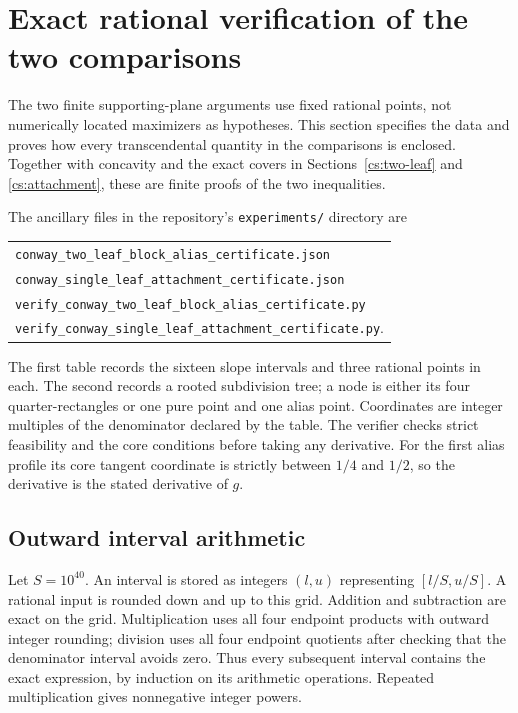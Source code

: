 \section{Exact rational verification of the two comparisons}\label{cs:arithmetic}

The two finite supporting-plane arguments use fixed rational points, not numerically located maximizers as hypotheses. This section specifies the data and proves how every transcendental quantity in the comparisons is enclosed. Together with concavity and the exact covers in Sections~\ref{cs:two-leaf} and \ref{cs:attachment}, these are finite proofs of the two inequalities.

The ancillary files in the repository's \texttt{experiments/} directory are
\begin{center}\small
\begin{tabular}{l}
\texttt{conway\_two\_leaf\_block\_alias\_certificate.json}\\
\texttt{conway\_single\_leaf\_attachment\_certificate.json}\\
\texttt{verify\_conway\_two\_leaf\_block\_alias\_certificate.py}\\
\texttt{verify\_conway\_single\_leaf\_attachment\_certificate.py}.
\end{tabular}
\end{center}
The first table records the sixteen slope intervals and three rational points in each. The second records a rooted subdivision tree; a node is either its four quarter-rectangles or one pure point and one alias point. Coordinates are integer multiples of the denominator declared by the table. The verifier checks strict feasibility and the core conditions before taking any derivative. For the first alias profile its core tangent coordinate is strictly between $1/4$ and $1/2$, so the derivative is the stated derivative of $g$.

\subsection{Outward interval arithmetic}
Let $S=10^{40}$. An interval is stored as integers $(l,u)$ representing $[l/S,u/S]$. A rational input is rounded down and up to this grid. Addition and subtraction are exact on the grid. Multiplication uses all four endpoint products with outward integer rounding; division uses all four endpoint quotients after checking that the denominator interval avoids zero. Thus every subsequent interval contains the exact expression, by induction on its arithmetic operations. Repeated multiplication gives nonnegative integer powers.

